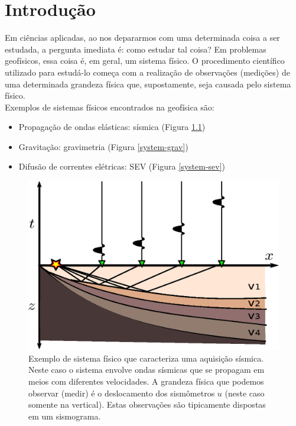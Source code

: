 \chapter{Introdução}
\label{chap:intro}

\indent Em ciências aplicadas, ao nos depararmos com uma determinada coisa a ser
estudada, a pergunta imediata é: como estudar tal coisa? Em problemas geofísicos,
essa coisa é, em geral, um sistema físico. O procedimento científico utilizado
para estudá-lo começa com a realização de observações (medições) de uma
determinada grandeza física que, supostamente, seja causada pelo sistema físico.
\\
\indent Exemplos de sistemas físicos encontrados na geofísica são:

\begin{itemize}
    \item{Propagação de ondas elásticas: sísmica (Figura \ref{system-seismic})}
    \item{Gravitação: gravimetria (Figura \ref{system-grav})}
    \item{Difusão de correntes elétricas: SEV (Figura \ref{system-sev})}
\end{itemize}

\begin{figure}
    \centering
    \includegraphics[scale=1]{../figs/system-seismic.eps}
    \caption{Exemplo de sistema físico que caracteriza uma aquisição sísmica.
        Neste caso o sistema envolve ondas sísmicas que se propagam em meios com
        diferentes velocidades. A grandeza física que podemos observar (medir)
        é o deslocamento dos sismômetros $u$ (neste caso somente na vertical).
        Estas observações são tipicamente dispostas em um sismograma.}
    \label{system-seismic}
\end{figure}

